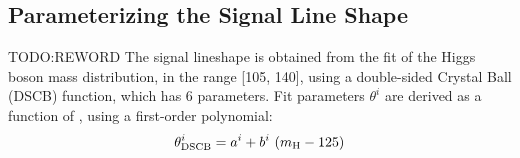 %
%

\subsection{Parameterizing the Signal Line Shape}
\label{sec:SignalParametrization}
TODO:REWORD The signal lineshape is obtained from the fit of the Higgs boson mass distribution, 
in the range [105, 140]\GeV, using a double-sided Crystal Ball (DSCB) function, which has 6 parameters.
Fit parameters $\theta^i$ are derived as a function of \mH, using a first-order polynomial:
\[
\theta^{i}_\text{DSCB} = a^i + b^{i}~(\mH - 125)%
\]

